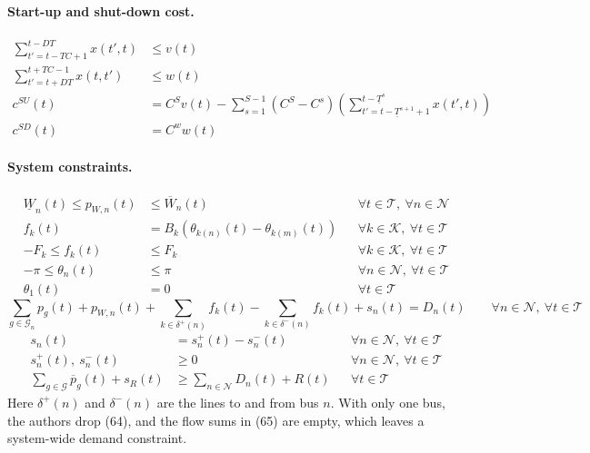 \documentclass[11pt]{article}
\newcommand{\pbar}{\overline{p}}
\begin{document}
\paragraph{Start-up and shut-down cost.}
\begin{align}
\sum_{t'=t-TC+1}^{t-DT} x(t',t) &\le v(t) \tag{59} \\
\sum_{t'=t+DT}^{t+TC-1} x(t,t') &\le w(t) \tag{60} \\
c^{SU}(t) &= C^S v(t) - \sum_{s=1}^{S-1} (C^S-C^s) \left( \sum_{t'=t-\underline{T}^{s+1}+1}^{t-\underline{T}^{s}} x(t',t) \right) \tag{61} \\
c^{SD}(t) &= C^w w(t) \tag{62}
\end{align}

\paragraph{System constraints.}
\begin{align}
\underline{W}_n(t) \le p_{W,n}(t) &\le \overline{W}_n(t) && \forall t \in \mathcal{T},\ \forall n \in \mathcal{N} \tag{63} \\
f_k(t) &= B_k \left( \theta_{k(n)}(t) - \theta_{k(m)}(t) \right) && \forall k \in \mathcal{K},\ \forall t \in \mathcal{T} \tag{64a} \\
-F_k \le f_k(t) &\le F_k && \forall k \in \mathcal{K},\ \forall t \in \mathcal{T} \tag{64b} \\
-\pi \le \theta_n(t) &\le \pi && \forall n \in \mathcal{N},\ \forall t \in \mathcal{T} \tag{64c} \\
\theta_1(t) &= 0 && \forall t \in \mathcal{T} \tag{64d}
\end{align}
\begin{equation}
\sum_{g \in \mathcal{G}_n} p_g(t) + p_{W,n}(t) + \sum_{k \in \delta^+(n)} f_k(t) - \sum_{k \in \delta^-(n)} f_k(t) + s_n(t) = D_n(t) \qquad \forall n \in \mathcal{N},\ \forall t \in \mathcal{T} \tag{65}
\end{equation}
\begin{align}
s_n(t) &= s_n^+(t) - s_n^-(t) && \forall n \in \mathcal{N},\ \forall t \in \mathcal{T} \tag{66a} \\
s_n^+(t),\ s_n^-(t) &\ge 0 && \forall n \in \mathcal{N},\ \forall t \in \mathcal{T} \tag{66b} \\
\sum_{g \in \mathcal{G}} \pbar_g(t) + s_R(t) &\ge \sum_{n \in \mathcal{N}} D_n(t) + R(t) && \forall t \in \mathcal{T} \tag{67}
\end{align}
Here $\delta^+(n)$ and $\delta^-(n)$ are the lines to and from bus $n$. With only one bus, the authors drop (64), and the flow sums in (65) are empty, which leaves a system-wide demand constraint.
\end{document}
